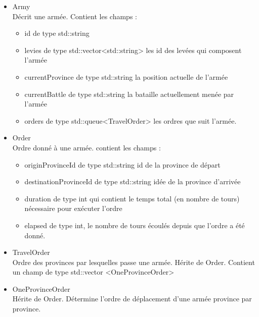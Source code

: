 \documentclass[a4paper,12pt]{article}
\begin{document}
\begin{itemize}
\item Army\\
Décrit une armée. Contient les champs : 
\begin{itemize}
\item id de type std::string
\item levies de type std::vector<std::string> les id des levées qui composent l'armée
\item currentProvince de type std::string la position actuelle de l'armée
\item currentBattle de type std::string la bataille actuellement menée par l'armée
\item orders de type std::queue<TravelOrder> les ordres que suit l'armée.
\end{itemize}
\item Order\\
Ordre donné à une armée. contient les champs :
\begin{itemize}
 \item originProvinceId de type std::string id de la province de départ
 \item destinationProvinceId de type std::string idée de la province d'arrivée
 \item duration de type int qui contient le temps total (en nombre de tours) nécessaire pour exécuter l'ordre
 \item elapsed de type int, le nombre de tours écoulés depuis que l'ordre a été donné.
 \end{itemize}
\item TravelOrder\\
Ordre des provinces par lesquelles passe une armée. Hérite de Order. Contient un champ de type std::vector <OneProvinceOrder> 
\item OneProvinceOrder\\
Hérite de Order. Détermine l'ordre de déplacement d'une armée province par province.


\end{itemize}
\end{document}
